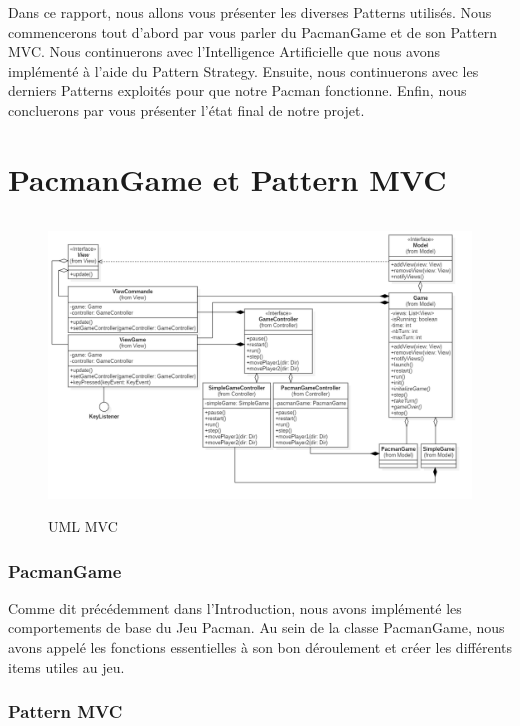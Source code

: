 \documentclass[a4paper, 11pt]{article}
\begin{document}
Dans ce rapport, nous allons vous présenter les diverses Patterns utilisés. Nous commencerons tout d'abord par vous parler du PacmanGame et de son Pattern MVC. Nous continuerons
avec l'Intelligence Artificielle que nous avons implémenté à l'aide du Pattern Strategy. Ensuite, nous continuerons avec les derniers Patterns exploités pour que notre 
Pacman fonctionne. Enfin, nous concluerons par vous présenter l'état final de notre projet.


\part{PacmanGame et Pattern MVC}

\begin{figure}[!ht]
  \begin{center}
  \includegraphics[height=7.8cm]{img/png/mvc}
  \end{center}
  \caption[schema]{UML MVC}
\end{figure}

\section{PacmanGame}
  
Comme dit précédemment dans l'Introduction, nous avons implémenté les comportements de base du Jeu Pacman. Au sein de la classe PacmanGame, nous avons appelé
les fonctions essentielles à son bon déroulement et créer les différents items utiles au jeu. \\
 
\section{Pattern MVC}
  
\end{document}
